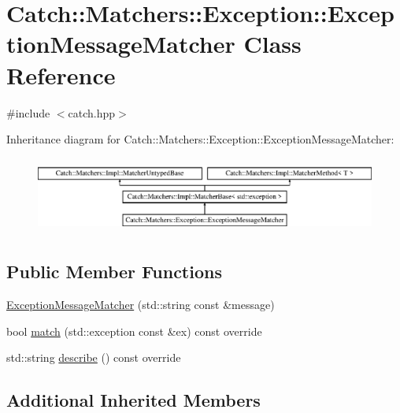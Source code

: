 \hypertarget{class_catch_1_1_matchers_1_1_exception_1_1_exception_message_matcher}{}\section{Catch\+:\+:Matchers\+:\+:Exception\+:\+:Exception\+Message\+Matcher Class Reference}
\label{class_catch_1_1_matchers_1_1_exception_1_1_exception_message_matcher}


{\ttfamily \#include $<$catch.\+hpp$>$}

Inheritance diagram for Catch\+:\+:Matchers\+:\+:Exception\+:\+:Exception\+Message\+Matcher\+:\begin{figure}[H]
\begin{center}
\leavevmode
\includegraphics[height=2.530120cm]{class_catch_1_1_matchers_1_1_exception_1_1_exception_message_matcher}
\end{center}
\end{figure}
\subsection*{Public Member Functions}
\begin{DoxyCompactItemize}
\item 
\mbox{\hyperlink{class_catch_1_1_matchers_1_1_exception_1_1_exception_message_matcher_ace55942f39ba653db3fd69d6d90e188f}{Exception\+Message\+Matcher}} (std\+::string const \&message)
\item 
bool \mbox{\hyperlink{class_catch_1_1_matchers_1_1_exception_1_1_exception_message_matcher_aa0566d24990d69e96495360b8f79593d}{match}} (std\+::exception const \&ex) const override
\item 
std\+::string \mbox{\hyperlink{class_catch_1_1_matchers_1_1_exception_1_1_exception_message_matcher_a3543441985ec877a781e660a403b1bae}{describe}} () const override
\end{DoxyCompactItemize}
\subsection*{Additional Inherited Members}


